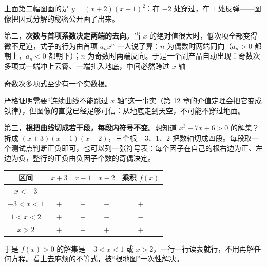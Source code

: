 \begin{center}
\end{center}

上面第二幅图画的是 $y=(x+2)(x-1)^2$：在 $-2$ 处穿过，在 $1$ 处反弹——图像把因式分解的秘密公开画了出来。

第二，\textbf{次数与首项系数决定两端的去向}。当 $x$ 的绝对值很大时，低次项全部变得微不足道，式子的行为由首项 $a_n x^n$ 一人说了算：$n$ 为偶数时两端同向（$a_n>0$ 都朝上，$a_n<0$ 都朝下）；$n$ 为奇数时两端反向。于是一个副产品自动出现：奇数次多项式一端冲上云霄、一端扎入地底，中间必然跨过 $x$ 轴——

\begin{tuilun}
奇数次多项式至少有一个实数根。
\end{tuilun}

严格证明需要“连续曲线不能跳过 $x$ 轴”这一事实（第 12 章的介值定理会把它变成铁律），但图像的直觉已经足够可信：从地底走到天空，不可能不穿过地面。

第三，\textbf{根把曲线切成若干段，每段内符号不变}。想知道 $x^3-7x+6>0$ 的解集？拆成 $(x+3)(x-1)(x-2)$，三个根 $-3$、$1$、$2$ 把数轴切成四段。每段取一个测试点判断正负即可，也可以列一张符号表：每个因子在自己的根右边为正、左边为负，整行的正负由负因子个数的奇偶决定。

\begin{center}
\begin{tabular}{ccccc}
\toprule
区间 & $x+3$ & $x-1$ & $x-2$ & 乘积 $f(x)$ \\
\midrule
$x<-3$ & $-$ & $-$ & $-$ & $-$ \\
$-3<x<1$ & $+$ & $-$ & $-$ & $+$ \\
$1<x<2$ & $+$ & $+$ & $-$ & $-$ \\
$x>2$ & $+$ & $+$ & $+$ & $+$ \\
\bottomrule
\end{tabular}
\end{center}

于是 $f(x)>0$ 的解集是 $-3<x<1$ 或 $x>2$，一行一行读表就行，不用再解任何方程。看上去麻烦的不等式，被“根地图”一次性解决。

